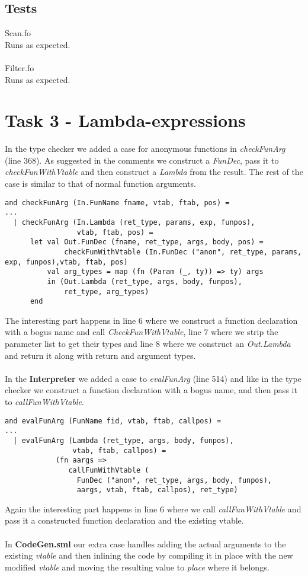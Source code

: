 \documentclass{article}
\begin{document}
\subsection{Tests}
Scan.fo\\
Runs as expected.\\
\\
Filter.fo\\
Runs as expected.\\

\newpage

\section{Task 3 - Lambda-expressions}
In the type checker we added a case for anonymous functions in \textit{checkFunArg} (line 368). As suggested in the comments we construct a \textit{FunDec}, pass it to \textit{checkFunWithVtable} and then construct a \textit{Lambda} from the result. The rest of the case is similar to that of normal function arguments.
\begin{lstlisting}
and checkFunArg (In.FunName fname, vtab, ftab, pos) =
...
  | checkFunArg (In.Lambda (ret_type, params, exp, funpos),
                 vtab, ftab, pos) =
      let val Out.FunDec (fname, ret_type, args, body, pos) = 
              checkFunWithVtable (In.FunDec ("anon", ret_type, params, exp, funpos),vtab, ftab, pos)
          val arg_types = map (fn (Param (_, ty)) => ty) args
          in (Out.Lambda (ret_type, args, body, funpos),
              ret_type, arg_types)
      end
\end{lstlisting}
\noindent The interesting part happens in line 6 where we construct a function declaration with a bogus name and call \textit{CheckFunWithVtable}, line 7 where we strip the parameter list to get their types and line 8 where we construct an \textit{Out.Lambda} and return it along with return and argument types.\\
\\
\noindent In the \textbf{Interpreter} we added a case to \textit{evalFunArg} (line 514) and like in the type checker we construct a function declaration with a bogus name, and then pass it to \textit{callFunWithVtable}.
\begin{lstlisting}
and evalFunArg (FunName fid, vtab, ftab, callpos) =
...
  | evalFunArg (Lambda (ret_type, args, body, funpos),
                vtab, ftab, callpos) =
            (fn aargs =>
               callFunWithVtable (
                 FunDec ("anon", ret_type, args, body, funpos),
                 aargs, vtab, ftab, callpos), ret_type)
\end{lstlisting}
\noindent Again the interesting part happens in line 6 where we call \textit{callFunWithVtable} and pass it a constructed function declaration and the existing vtable.\\
\\
\noindent In \textbf{CodeGen.sml} our extra case handles adding the actual arguments to the existing \textit{vtable} and then inlining the code by compiling it in place with the new modified \textit{vtable} and moving the resulting value to \textit{place} where it belongs.
\end{document}
